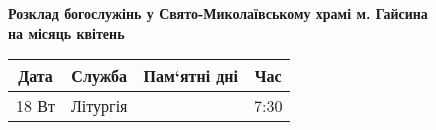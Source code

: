 \documentclass[12 pt, a4paper]{article}
\begin{document}
\large
\begin{center}

{\bfseries Розклад богослужінь у Свято-Миколаївському храмі м. Гайсина \\ на місяць квітень}

\medskip

\begin{tabular}{| c | c | c | c |}
\hline
\textbf{Дата} & \textbf{Служба} & \textbf{Пам‘ятні дні} & \textbf{Час} \\
\hline
18 Вт & Літургія & & 7:30 \\
\hline
\end{tabular}
\end{center}
\end{document}

